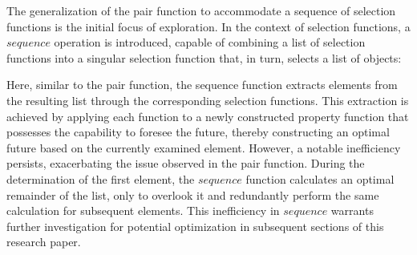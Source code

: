The generalization of the pair function to accommodate a sequence of selection functions 
is the initial focus of exploration. In the context of selection functions, a $sequence$ 
operation is introduced, capable of combining a list of selection functions into a 
singular selection function that, in turn, selects a list of objects:
\resethooks
Here, similar to the pair function, the sequence function extracts elements from the 
resulting list through the corresponding selection functions. This extraction is achieved 
by applying each function to a newly constructed property function that possesses the 
capability to foresee the future, thereby constructing an optimal future based on the 
currently examined element.
However, a notable inefficiency persists, exacerbating the issue observed in the pair 
function. During the determination of the first element, the $sequence$ function 
calculates an optimal remainder of the list, only to overlook it and redundantly perform 
the same calculation for subsequent elements. This inefficiency in $sequence$ warrants 
further investigation for potential optimization in subsequent sections of this research 
paper.

